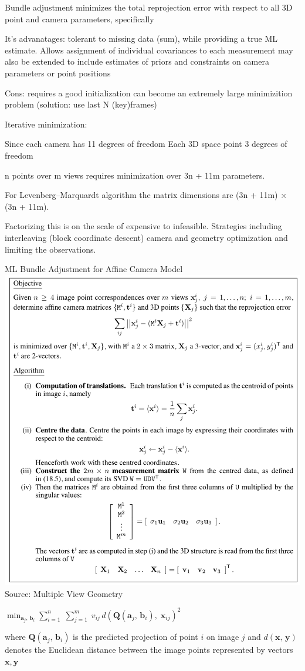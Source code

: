 Bundle adjustment minimizes the total reprojection error with respect to all 3D point and camera parameters, specifically

It's advanatages: tolerant to missing data (sum), while providing a true ML estimate. 
Allows assignment of individual covariances to each measurement
may also be extended to include estimates of priors and constraints on camera parameters or point positions

Cons:
requires a good initialization 
can become an extremely large minimizition problem (solution: use last N (key)frames)

Iterative minimization:

Since each camera has 11 degrees of freedom 
Each 3D space point 3 degrees of freedom

n points over m views requires minimization over 3n + 11m parameters. 

For Levenberg–Marquardt algorithm the matrix dimensions are (3n + 11m) × (3n + 11m). 

Factorizing this is on the scale of expensive to infeasible. Strategies including interleaving (block coordinate descent) camera and geometry optimization and limiting the observations.

ML Bundle Adjustment for Affine Camera Model
\includegraphics[width=0.5\columnwidth]{cv_figures/ml_bundle.png}
Source: Multiple View Geometry



$\min _{{{\mathbf  {a}}_{j},\,{\mathbf  {b}}_{i}}}\displaystyle \sum _{{i=1}}^{{n}}\;\displaystyle \sum _{{j=1}}^{{m}}\;v_{{ij}}\,d({\mathbf  {Q}}({\mathbf  {a}}_{j},\,{\mathbf  {b}}_{i}),\;{\mathbf{x}}_{{ij}})^{2}$

where $\mathbf {Q} (\mathbf {a} _{j},\,\mathbf {b} _{i})$ is the predicted projection of point $i$ on image $j$ and $d(\mathbf {x} ,\,\mathbf {y} )$  denotes the Euclidean distance between the image points represented by vectors $\mathbf{x,y}$

